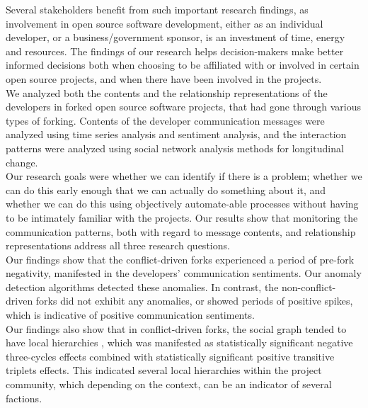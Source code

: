 \documentclass[12pt,letterpaper]{gthesis2}  %
\begin{document}
Several stakeholders benefit from such important research findings, as involvement in open source software development, either as an individual developer, or a business/government sponsor, is an investment of time, energy and resources. The findings of our research helps decision-makers make better informed decisions both when choosing to be affiliated with or involved in certain open source projects, and when there have been involved in the projects.\\

We analyzed both the contents and the relationship representations of the developers in forked open source software projects, that had gone through various types of forking. Contents of the developer communication messages were analyzed using time series analysis and sentiment analysis, and the interaction patterns were analyzed using social network analysis methods for longitudinal change. \\

Our research goals were whether we can identify if there is a problem; whether we can do this early enough that we can actually do something about it, and whether we can do this using objectively automate-able processes without having to be intimately familiar with the projects. Our results show that monitoring the communication patterns, both with regard to message contents, and relationship representations address all three research questions. \\

Our findings show that the conflict-driven forks experienced a period of pre-fork negativity, manifested in the developers' communication sentiments. Our anomaly detection algorithms detected these anomalies. In contrast, the non-conflict-driven forks did not exhibit any anomalies, or showed periods of positive spikes, which is indicative of positive communication sentiments. \\

Our findings also show that in conflict-driven forks, the social graph tended to have local hierarchies \cite{Snijders2010}, which was manifested as statistically significant negative three-cycles effects combined with statistically significant positive transitive triplets effects. This indicated several local hierarchies within the project community, which depending on the context, can be an indicator of several factions. \\ 
\end{document}
